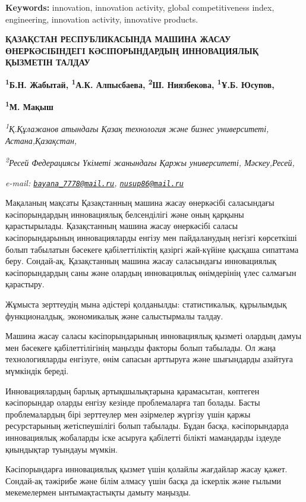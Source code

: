 {{{\bfseries Keywords:} innovation, innovation activity, global
competitiveness index, engineering, innovation activity, innovative
products.

{\bfseries ҚАЗАҚСТАН РЕСПУБЛИКАСЫНДА МАШИНА ЖАСАУ ӨНЕРКӘСІБІНДЕГІ
КӘСІПОРЫНДАРДЫҢ ИННОВАЦИЯЛЫҚ ҚЫЗМЕТІН ТАЛДАУ}

{\bfseries \textsuperscript{1}Б.Н. Жабытай\textsuperscript{\envelope },
\textsuperscript{1}А.К. Алпысбаева, \textsuperscript{2}Ш. Ниязбекова,
\textsuperscript{1}Ұ.Б. Юсупов\textsuperscript{\envelope },}

{\bfseries \textsuperscript{1}М. Мақыш}

\emph{\textsuperscript{1}Қ.Құлажанов атындағы Қазақ технология және
бизнес университеті, Астана,Қазақстан,}

\emph{\textsuperscript{2}Ресей Федерациясы Үкіметі жанындағы Қаржы
университеті, Мәскеу,Ресей,}

\emph{e-mail:
\href{mailto:bayana_7778@mail.ru}{\nolinkurl{bayana\_7778@mail.ru}},
\href{mailto:nusup86@mail.ru}{\nolinkurl{nusup86@mail.ru}}}

Мақаланың мақсаты Қазақстанның машина жасау өнеркәсібі саласындағы
кәсіпорындардың инновациялық белсенділігі және оның қарқыны
қарастырылады. Қазақстанның машина жасау өнеркәсібі саласы
кәсіпорындарының инновацияларды енгізу мен пайдаланудың негізгі
көрсеткіші болып табылатын бәсекеге қабілеттіліктің қазіргі жай-күйіне
қысқаша сипаттама беру. Сондай-ақ, Қазақстанның машина жасау саласындағы
инновациялық кәсіпорындардың саны және олардың инновациялық өнімдерінің
үлес салмағын қарастыру.

Жұмыста зерттеудің мына әдістері қолданылды: статистикалық, құрылымдық
функционалдық, экономикалық және салыстырмалы талдау.

Машина жасау саласы кәсіпорындарының инновациялық қызметі олардың дамуы
мен бәсекеге қабілеттілігінің маңызды факторы болып табылады. Ол жаңа
технологияларды енгізуге, өнім сапасын арттыруға және шығындарды
азайтуға мүмкіндік береді.

Инновациялардың барлық артықшылықтарына қарамасытан, көптеген
кәсіпорындар оларды енгізу кезінде проблемаларға тап болады. Басты
проблемалардың бірі зерттеулер мен әзірмелер жүргізу үшін қаржы
ресурстарының жетіспеушілігі болып табылады. Бұдан басқа, кәсіпорындарда
инновациялық жобаларды іске асыруға қабілетті білікті мамандарды іздеуде
қиындықтар туындауы мүмкін.

Кәсіпорындарға инновациялық қызмет үшін қолайлы жағдайлар жасау қажет.
Сондай-ақ тәжірибе және білім алмасу үшін басқа да іскерлік және ғылыми
мекемелермен ынтымақтастықты дамыту маңызды.

}}
